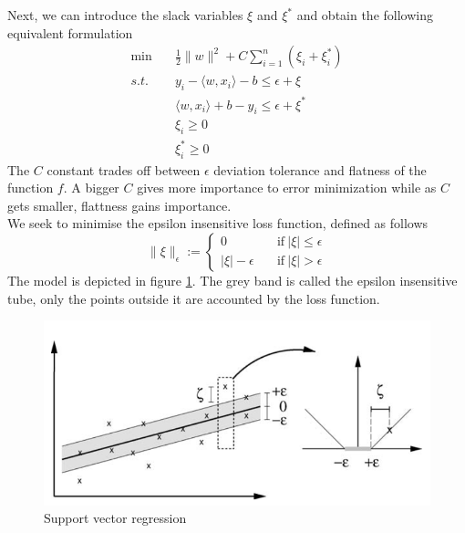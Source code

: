 Next, we can introduce the slack variables $\xi$ and $\xi^*$ and obtain the following equivalent formulation
\begin{equation}
    \begin{aligned}
        \min \quad& \frac{1}{2}\|w\|^2+C\sum\limits_{i=1}^n(\xi_i+\xi_i^*)
        \\
        s.t. \quad& y_i-\langle w, x_i\rangle-b\leq \epsilon+\xi
        \\
        \quad& \langle w, x_i\rangle +b-y_i\leq \epsilon+\xi^*
        \\
        \quad& \xi_i\geq0
        \\
        \quad& \xi_i^*\geq0
    \end{aligned}
\end{equation}
The $C$ constant trades off between $\epsilon$ deviation tolerance and flatness of the function $f$. A bigger $C$ gives more importance to error minimization while as $C$ gets smaller, flattness gains importance.
\\
We seek to minimise the epsilon insensitive loss function, defined as follows
\begin{equation}
    \|\xi\|_\epsilon:=\begin{cases}
        0 \quad& \textrm{if} \ |\xi|\leq \epsilon
        \\
        |\xi|-\epsilon \quad& \textrm{if} \ |\xi| > \epsilon
    \end{cases}
\end{equation}
The model is depicted in figure \ref{fig:svm_simple}. The grey band is called the epsilon insensitive tube, only the points outside it are accounted by the loss function.
\begin{figure}
    \includegraphics[width=\textwidth]{images/svm_simple.png}    
    \caption{Support vector regression \cite{learning_with_kernels}}
    \label{fig:svm_simple}
\end{figure}
